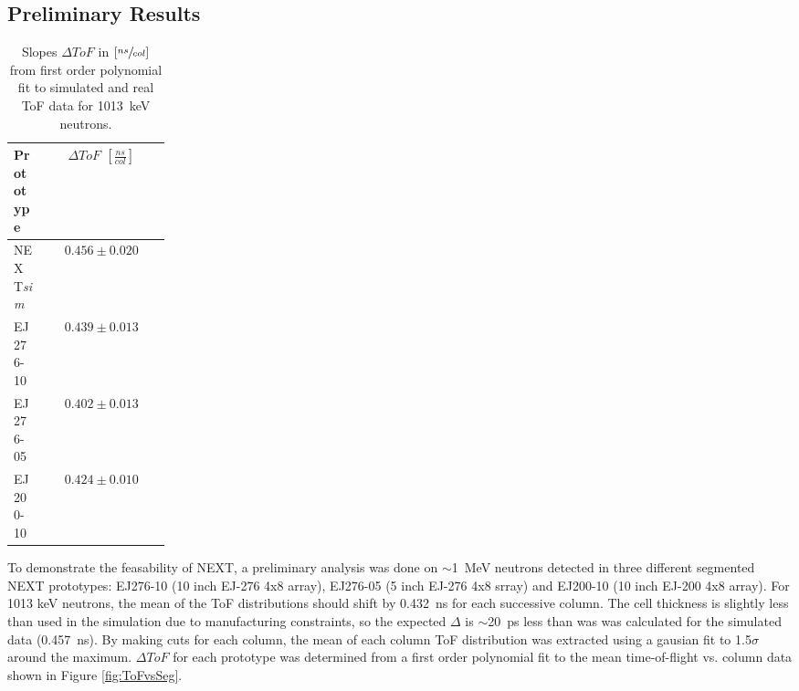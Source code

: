 \subsection{Preliminary Results}
\begin{table}[t]
\caption{Slopes $\Delta ToF$ in $\left[\sfrac{ns}{col}\right]$ from first order polynomial fit to simulated and real ToF data for 1013~keV neutrons.}
\label{tab:Slopes}
\begin{center}
\begin{tabular}{p{0.2\linewidth} c}
 \hline
 Prototype & $\Delta ToF$ $\left[\frac{ns}{col}\right]$  \\
 \hline
 \hline
 NEXT\emph{sim}    & $0.456\pm0.020$  \\
 EJ276-10  & $0.439\pm0.013$  \\
 EJ276-05  & $0.402\pm0.013$  \\
 EJ200-10  & $0.424\pm0.010$  \\
 \hline
\end{tabular}
\end{center}
\end{table}
To demonstrate the feasability of NEXT, a preliminary analysis was done on $\sim$1~MeV neutrons detected in three different segmented NEXT prototypes: EJ276-10 (10 inch EJ-276 4x8 array), EJ276-05 (5 inch EJ-276 4x8 srray) and EJ200-10 (10 inch EJ-200 4x8 array). For 1013 keV neutrons, the mean of the ToF distributions should shift by 0.432~ns for each successive column. The cell thickness is slightly less than used in the simulation due to manufacturing constraints, so the expected $\Delta$ is $\sim$20~ps less than was was calculated for the simulated data (0.457~ns). By making cuts for each column, the mean of each column ToF distribution was extracted using a gausian fit to 1.5$\sigma$ around the maximum. $\Delta ToF$ for each prototype was determined from a first order polynomial fit to the mean time-of-flight vs. column data shown in Figure \ref{fig:ToFvsSeg}.
